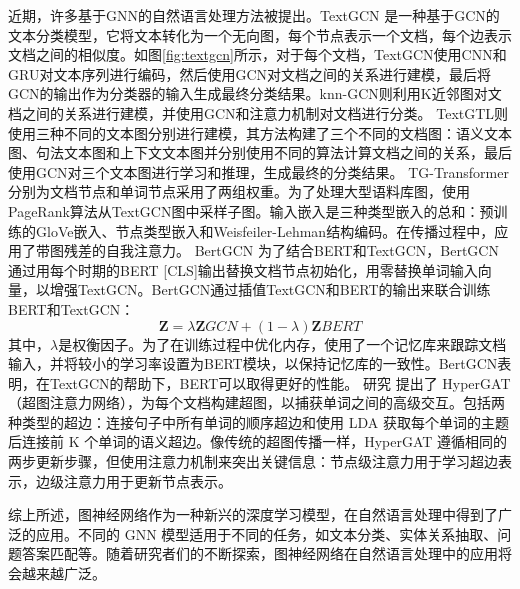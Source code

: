 近期，许多基于GNN的自然语言处理方法被提出。TextGCN \cite{TEXTGCN2019}是一种基于GCN的文本分类模型，它将文本转化为一个无向图，每个节点表示一个文档，每个边表示文档之间的相似度。如图\ref{fig:textgcn}所示，对于每个文档，TextGCN使用CNN和GRU对文本序列进行编码，然后使用GCN对文档之间的关系进行建模，最后将GCN的输出作为分类器的输入生成最终分类结果。knn-GCN则利用K近邻图对文档之间的关系进行建模，并使用GCN和注意力机制对文档进行分类。
TextGTL\cite{TEXTGTL2021}则使用三种不同的文本图分别进行建模，其方法构建了三个不同的文档图：语义文本图、句法文本图和上下文文本图并分别使用不同的算法计算文档之间的关系，最后使用GCN对三个文本图进行学习和推理，生成最终的分类结果。
TG-Transformer\cite{TGTRANSFORMER2020}分别为文档节点和单词节点采用了两组权重。为了处理大型语料库图，使用PageRank算法\cite{page1999pagerank}从TextGCN图中采样子图。输入嵌入是三种类型嵌入的总和：预训练的GloVe嵌入、节点类型嵌入和Weisfeiler-Lehman结构编码\cite{niepert2016learning}。在传播过程中，应用了带图残差\cite{zhang2019gresnet}的自我注意力\cite{vaswani2017attention}。
BertGCN\cite{BERTGCN2021}\textbf{ }
为了结合BERT\cite{BERT}和TextGCN，BertGCN通过用每个时期的BERT [CLS]输出替换文档节点初始化，用零替换单词输入向量，以增强TextGCN。BertGCN通过插值TextGCN和BERT的输出来联合训练BERT和TextGCN：
\begin{equation}
\bm{Z} = \lambda\bm{Z}{GCN} + (1-\lambda)\bm{Z}{BERT}
\end{equation}
\vspace{1pt}
其中，$\lambda$是权衡因子。为了在训练过程中优化内存，使用了一个记忆库来跟踪文档输入，并将较小的学习率设置为BERT模块，以保持记忆库的一致性。BertGCN表明，在TextGCN的帮助下，BERT可以取得更好的性能。
研究\cite{HYPERGAT2020} 提出了 HyperGAT（超图注意力网络），为每个文档构建超图，以捕获单词之间的高级交互。包括两种类型的超边：连接句子中所有单词的顺序超边和使用 LDA 获取每个单词的主题后连接前 K 个单词的语义超边。像传统的超图传播一样，HyperGAT 遵循相同的两步更新步骤，但使用注意力机制来突出关键信息：节点级注意力用于学习超边表示，边级注意力用于更新节点表示。

综上所述，图神经网络作为一种新兴的深度学习模型，在自然语言处理中得到了广泛的应用。不同的 GNN 模型适用于不同的任务，如文本分类、实体关系抽取、问题答案匹配等。随着研究者们的不断探索，图神经网络在自然语言处理中的应用将会越来越广泛。




